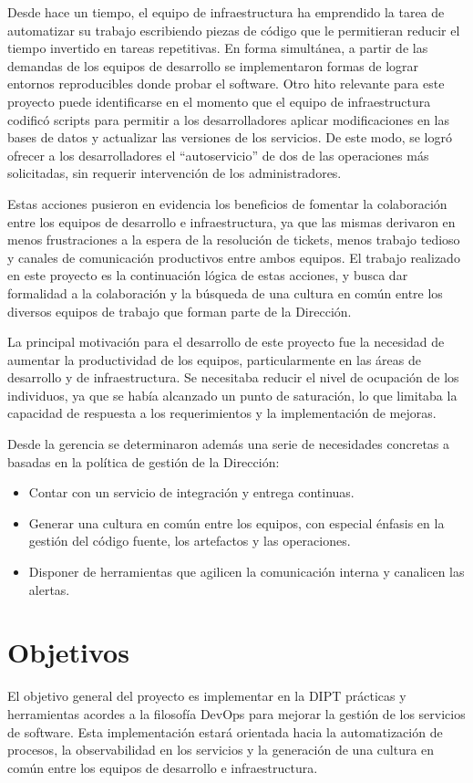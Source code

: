 Desde hace un tiempo, el equipo de infraestructura ha emprendido la
tarea de automatizar su trabajo escribiendo piezas de código que le
permitieran reducir el tiempo invertido en tareas repetitivas. En
forma simultánea, a partir de las demandas de los equipos de
desarrollo se implementaron formas de lograr entornos reproducibles
donde probar el software. Otro hito relevante para este proyecto puede
identificarse en el momento que el equipo de infraestructura codificó
scripts para permitir a los desarrolladores aplicar modificaciones en
las bases de datos y actualizar las versiones de los servicios. De
este modo, se logró ofrecer a los desarrolladores el ``autoservicio'' de
dos de las operaciones más solicitadas, sin requerir intervención de
los administradores.

Estas acciones pusieron en evidencia los beneficios de fomentar la
colaboración entre los equipos de desarrollo e infraestructura, ya que
las mismas derivaron en menos frustraciones a la espera de la
resolución de tickets, menos trabajo tedioso y canales de comunicación
productivos entre ambos equipos. El trabajo realizado en este proyecto
es la continuación lógica de estas acciones, y busca dar formalidad a
la colaboración y la búsqueda de una cultura en común entre los
diversos equipos de trabajo que forman parte de la Dirección.

La principal motivación para el desarrollo de este proyecto fue la
necesidad de aumentar la productividad de los equipos, particularmente
en las áreas de desarrollo y de infraestructura. Se necesitaba reducir
el nivel de ocupación de los individuos, ya que se había alcanzado un
punto de saturación, lo que limitaba la capacidad de respuesta a los
requerimientos y la implementación de mejoras.

Desde la gerencia se determinaron además una serie de necesidades
concretas a basadas en la política de gestión de la Dirección:
%
\begin{itemize}
\item Contar con un servicio de integración y entrega continuas.
\item Generar una cultura en común entre los equipos, con especial
  énfasis en la gestión del código fuente, los artefactos y las
  operaciones.
\item Disponer de herramientas que agilicen la comunicación interna y
  canalicen las alertas.
\end{itemize}
\section{Objetivos}
%
El objetivo general del proyecto es implementar en la DIPT prácticas y
herramientas acordes a la filosofía DevOps para mejorar la gestión de
los servicios de software. Esta implementación estará orientada hacia
la automatización de procesos, la observabilidad en los servicios y la
generación de una cultura en común entre los equipos de desarrollo e
infraestructura.
%
